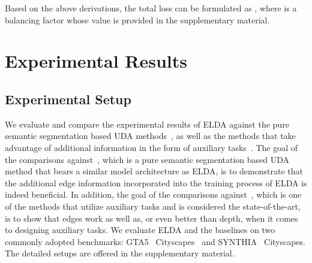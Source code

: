 \documentclass{bmvc2k}
\begin{document}
Based on the above derivations, the total loss can be formulated as ,
where  is a balancing factor whose value is provided in the supplementary material.



































%
 






\section{Experimental Results}
\label{sec::experiments}











\subsection{Experimental Setup}
\label{subsec::experimental_setup}

We evaluate and compare the experimental results of ELDA against the pure semantic segmentation based UDA methods~\cite{mei2020instance,tranheden2020dacs,zhang2021prototypical,zhang2019category,zheng2020rectifying,zou2018domain,yang2020fda,lv2020pit}, as well as the methods that take advantage of additional information in the form of auxiliary tasks~\cite{vu2019dada,wang2021domain,Lee2019SPIGANPA,Chen_2019_GIOada,Saha_2021_CVPR_CTRL,guizilini2021geometric}.
The goal of the comparisons against~\cite{tranheden2020dacs}, which is a pure semantic segmentation based UDA method that bears a similar model architecture as ELDA, is to demonstrate that the additional edge information incorporated into the training process of ELDA is indeed beneficial. In addition, the goal of the comparisons against~\cite{wang2021domain}, which is one of the methods that utilize auxiliary tasks and is considered the state-of-the-art, is to show that edges work as well as, or even better than depth, when it comes to designing auxiliary tasks.
We evaluate ELDA and the baselines on two commonly adopted benchmarks: GTA5~\cite{richter2016playing} Cityscapes~\cite{cordts2016cityscapes} and SYNTHIA~\cite{Ros_2016_CVPR} Cityscapes. 
The detailed setups are offered in the supplementary material.
\end{document}
